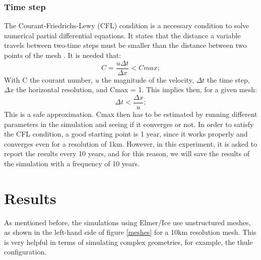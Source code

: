 \documentclass{article}
\begin{document}
\subsubsection{Time step}
The Courant-Friedrichs-Lewy (CFL) condition is a necessary condition to solve numerical partial differential equations. It states that the distance a variable travels between two-time steps must be smaller than the distance between two points of the mesh \cite[]{courant1967partial}. It is needed that:
\begin{equation}
	C=\frac{u\Delta t}{\Delta x}<Cmax;
\end{equation}
With C the courant number, $u$ the magnitude of the velocity, $\Delta t$ the time step, $\Delta x$ the horizontal resolution, and Cmax = 1. This implies then, for a given mesh:
\begin{equation}
	\Delta t < \frac{\Delta x}{u};
\end{equation}
This is a safe approximation. Cmax then has to be estimated by running different parameters in the simulation and seeing if it converges or not. In order to satisfy the CFL condition, a good starting point is 1 year, since it works properly and converges even for a resolution of 1km.
However, in this experiment, it is asked to report the results every 10 years, and for this reason, we will save the results of the simulation with a frequency of 10 years. 

\section{Results}
As mentioned before, the simulations using Elmer/Ice use unstructured meshes, as shown in the left-hand side of figure \ref{meshes} for a 10km resolution mesh. This is very helpful in terms of simulating complex geometries, for example, the thule configuration.
\end{document}
